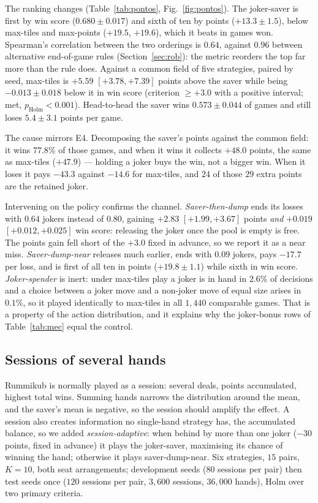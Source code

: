 \documentclass[10pt,journal,compsoc]{IEEEtran}
\begin{document}
The ranking changes (Table~\ref{tab:pontos}, Fig.~\ref{fig:pontos}). The joker-saver is first by win score ($0.680\pm0.017$) and sixth of ten by points ($+13.3\pm1.5$), below max-tiles and max-points ($+19.5$, $+19.6$), which it beats in games won. Spearman's correlation between the two orderings is $0.64$, against $0.96$ between alternative end-of-game rules (Section~\ref{sec:rob}): the metric reorders the top far more than the rule does. Against a common field of five strategies, paired by seed, max-tiles is $+5.59$ $[+3.78,+7.39]$ points above the saver while being $-0.013\pm0.018$ below it in win score (criterion $\ge+3.0$ with a positive interval; met, $p_{\text{Holm}}<0.001$). Head-to-head the saver wins $0.573\pm0.044$ of games and still loses $5.4\pm3.1$ points per game.

The cause mirrors E4. Decomposing the saver's points against the common field: it wins $77.8\%$ of those games, and when it wins it collects $+48.0$ points, the same as max-tiles ($+47.9$) --- holding a joker buys the win, not a bigger win. When it loses it pays $-43.3$ against $-14.6$ for max-tiles, and $24$ of those $29$ extra points are the retained joker.

Intervening on the policy confirms the channel. \emph{Saver-then-dump} ends its losses with $0.64$ jokers instead of $0.80$, gaining $+2.83$ $[+1.99,+3.67]$ points \emph{and} $+0.019$ $[+0.012,+0.025]$ win score: releasing the joker once the pool is empty is free. The points gain fell short of the $+3.0$ fixed in advance, so we report it as a near miss. \emph{Saver-dump-near} releases much earlier, ends with $0.09$ jokers, pays $-17.7$ per loss, and is first of all ten in points ($+19.8\pm1.1$) while sixth in win score. \emph{Joker-spender} is inert: under max-tiles play a joker is in hand in $2.6\%$ of decisions and a choice between a joker move and a non-joker move of equal size arises in $0.1\%$, so it played identically to max-tiles in all $1{,}440$ comparable games. That is a property of the action distribution, and it explains why the joker-bonus rows of Table~\ref{tab:mec} equal the control.

\subsection{Sessions of several hands}\label{sec:session}
Rummikub is normally played as a session: several deals, points accumulated, highest total wins. Summing hands narrows the distribution around the mean, and the saver's mean is negative, so the session should amplify the effect. A session also creates information no single-hand strategy has, the accumulated balance, so we added \emph{session-adaptive}: when behind by more than one joker ($-30$ points, fixed in advance) it plays the joker-saver, maximising its chance of winning the hand; otherwise it plays saver-dump-near. Six strategies, $15$ pairs, $K=10$, both seat arrangements; development seeds ($80$ sessions per pair) then test seeds once ($120$ sessions per pair, $3{,}600$ sessions, $36{,}000$ hands), Holm over two primary criteria.
\end{document}
